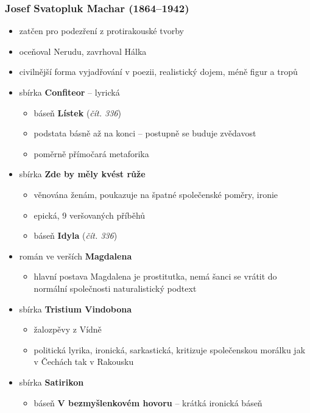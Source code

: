\subsubsection{Josef Svatopluk Machar (1864--1942)}
\begin{itemize}
\item zatčen pro podezření z protirakouské tvorby
\item oceňoval Nerudu, zavrhoval Hálka
\item civilnější forma vyjadřování v poezii, realistický dojem, méně figur a tropů
\item sbírka \textbf{Confiteor} -- lyrická
	\begin{itemize}
	\item báseň \textbf{Lístek} (\textit{čít. 336})
	\item podstata básně až na konci -- postupně se buduje zvědavost
	\item poměrně přímočará metaforika
	\end{itemize}
\item sbírka \textbf{Zde by měly kvést růže}
	\begin{itemize}
	\item věnována ženám, poukazuje na špatné společenské poměry, ironie
	\item epická, 9 veršovaných příběhů
	\item báseň \textbf{Idyla} (\textit{čít. 336})
	\end{itemize}
\item román ve verších \textbf{Magdalena}
	\begin{itemize}
	\item hlavní postava Magdalena je prostitutka, nemá šanci se vrátit do normální společnosti \ra naturalistický podtext
	\end{itemize}
\item sbírka \textbf{Tristium Vindobona}
	\begin{itemize}
	\item žalozpěvy z Vídně
	\item politická lyrika, ironická, sarkastická, kritizuje společenskou morálku jak v Čechách tak v Rakousku
	\end{itemize}
\item sbírka \textbf{Satirikon}
	\begin{itemize}
	\item báseň \textbf{V bezmyšlenkovém hovoru} -- krátká ironická báseň
	\end{itemize}
\end{itemize}

